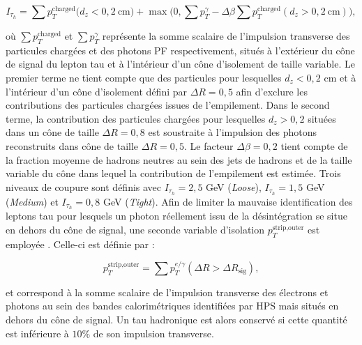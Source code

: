 \begin{equation*}
    I_{\tau_h}=\sum p_T^{\text{charged}}\bigl(d_z<0,2~\mbox{cm})+\max(0,\sum p_T^{\gamma}-\Delta\beta\sum p_T^{\text{charged}}(d_z>0,2~\mbox{cm})\bigr),
\end{equation*}

où $\sum p_T^{\text{charged}}$ et $\sum p_T^{\gamma}$ représente la somme scalaire de l'impulsion transverse des particules chargées et des photons PF respectivement, situés à l'extérieur du cône de signal du lepton tau et à l'intérieur d'un cône d'isolement de taille variable. Le premier terme ne tient compte que des particules pour lesquelles $d_z<0,2$ cm et à l'intérieur d'un cône d'isolement défini par $\Delta R=0,5$ afin d'exclure les contributions des particules chargées issues de l'empilement. Dans le second terme, la contribution des particules chargées pour lesquelles $d_z>0,2$ situées dans un cône de taille $\Delta R=0,8$ est soustraite à l'impulsion des photons reconstruits dans cône de taille $\Delta R=0,5$. Le facteur $\Delta\beta=0,2$ tient compte de la fraction moyenne de hadrons neutres au sein des jets de hadrons et de la taille variable du cône dans lequel la contribution de l'empilement est estimée. Trois niveaux de coupure sont définis avec $I_{\tau_h}=2,5$ GeV (\textit{Loose}), $I_{\tau_h}=1,5$ GeV (\textit{Medium}) et $I_{\tau_h}=0,8$ GeV (\textit{Tight}). Afin de limiter la mauvaise identification des leptons tau pour lesquels un photon réellement issu de la désintégration se situe en dehors du cône de signal, une seconde variable d'isolation $p_T^{\text{strip,outer}}$ est employée \cite{taureco}. Celle-ci est définie par :

\begin{equation}
    p_T^{\text{strip,outer}}=\sum p_T^{e/\gamma}(\Delta R>\Delta R_{\text{sig}}),     
\end{equation}

et correspond à la somme scalaire de l'impulsion transverse des électrons et photons au sein des bandes calorimétriques identifiées par HPS mais situés en dehors du cône de signal. Un tau hadronique est alors conservé si cette quantité est inférieure à $10\%$ de son impulsion transverse. \\

